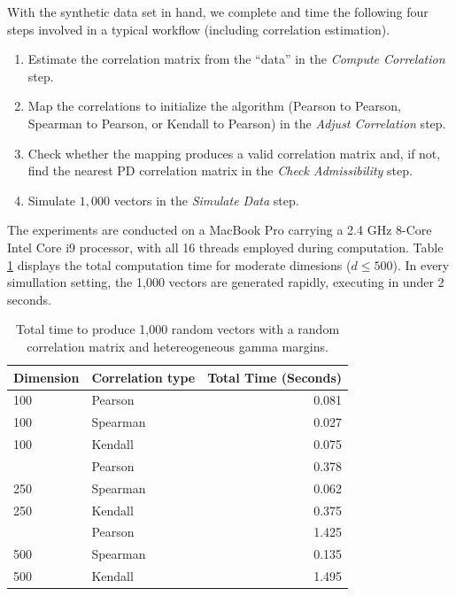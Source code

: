 \documentclass[
]{jss}
\providecommand{\tightlist}{%
  \setlength{\itemsep}{0pt}\setlength{\parskip}{0pt}}
\begin{document}
With the synthetic data set in hand, we complete and time the following four steps involved in a typical workflow (including correlation estimation).


\begin{enumerate}
\def\labelenumi{\arabic{enumi}.}
\tightlist
\item
  Estimate the correlation matrix from the ``data'' in the \emph{Compute Correlation} step.
\item
  Map the correlations to initialize the algorithm (Pearson to Pearson, Spearman to Pearson, or Kendall to Pearson) in the \emph{Adjust Correlation} step.
\item
  Check whether the mapping produces a valid correlation matrix and, if not, find the nearest PD correlation matrix in the \emph{Check Admissibility} step.
\item
  Simulate \(1,000\) vectors in the \emph{Simulate Data} step.
\end{enumerate}

The experiments are conducted on a MacBook Pro carrying a 2.4 GHz 8-Core Intel Core i9 processor, with all 16 threads employed during computation. Table \ref{tab:ch040-moderateDtab} displays the total computation time for moderate dimesions (\(d \leq 500\)). In every simullation setting, the 1,000 vectors are generated rapidly, executing in under 2 seconds.

\begin{CodeChunk}
\begin{table}

\caption{\label{tab:ch040-moderateDtab}Total time to produce 1,000 random vectors with a random correlation matrix and hetereogeneous gamma margins.}
\centering
\begin{tabular}[t]{llr}
\toprule
Dimension & Correlation type & Total Time (Seconds)\\
\midrule
100 & Pearson & 0.081\\
100 & Spearman & 0.027\\
100 & Kendall & 0.075\\
\addlinespace
250 & Pearson & 0.378\\
250 & Spearman & 0.062\\
250 & Kendall & 0.375\\
\addlinespace
500 & Pearson & 1.425\\
500 & Spearman & 0.135\\
500 & Kendall & 1.495\\
\bottomrule
\end{tabular}
\end{table}

\end{CodeChunk}
\end{document}
